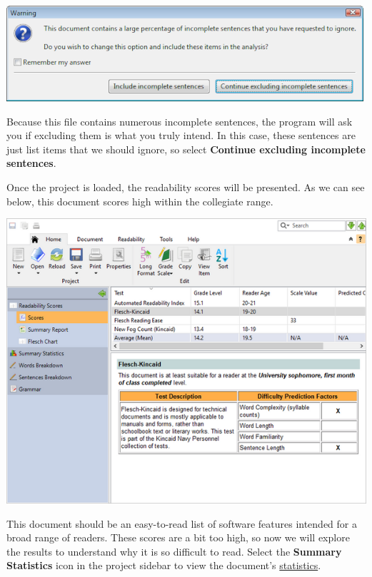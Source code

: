 \documentclass[
]{book}
\theoremstyle{definition}
\theoremstyle{definition}
\theoremstyle{definition}
\theoremstyle{definition}
\theoremstyle{remark}
\begin{document}
\begin{center}\includegraphics[width=0.5\linewidth,]{Images/NonGenerated/sentencewarning} \end{center}

Because this file contains numerous incomplete sentences, the program will ask you if excluding them is what you truly intend. In this case, these sentences are just list items that we should ignore, so select \textbf{Continue excluding incomplete sentences}.

Once the project is loaded, the readability scores will be presented. As we can see below, this document scores high within the collegiate range.

\includegraphics{Images/featuresscores.png}

This document should be an easy-to-read list of software features intended for a broad range of readers. These scores are a bit too high, so now we will explore the results to understand why it is so difficult to read. Select the \textbf{Summary Statistics} icon in the project sidebar to view the document's \protect\hyperlink{reviewing-statistics}{statistics}.
\end{document}
